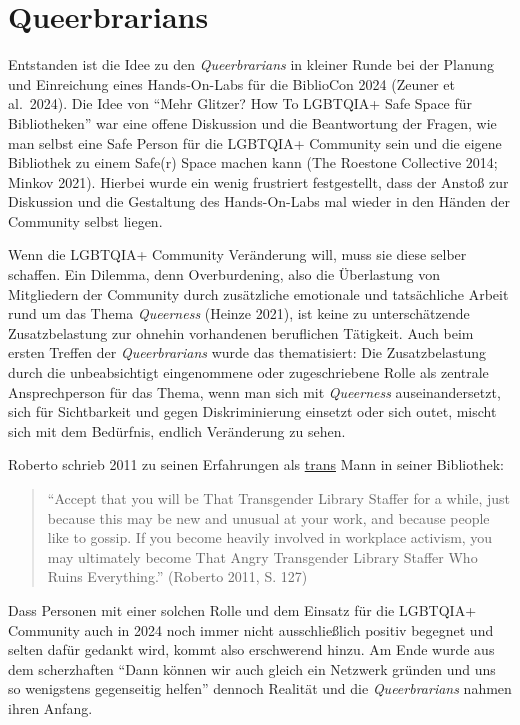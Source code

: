 \documentclass[a4paper,
fontsize=11pt,
oneside,
numbers=noperiodatend,
parskip=half-,
bibliography=totoc,
final
]{scrartcl}
\begin{document}
\section{Queerbrarians}\label{queerbrarians}

Entstanden ist die Idee zu den \emph{Queerbrarians} in kleiner Runde bei
der Planung und Einreichung eines Hands-On-Labs für die BiblioCon 2024
(Zeuner et al.~2024). Die Idee von \enquote{Mehr Glitzer? How To
LGBTQIA+ Safe Space für Bibliotheken} war eine offene Diskussion und die
Beantwortung der Fragen, wie man selbst eine Safe Person für die
LGBTQIA+ Community sein und die eigene Bibliothek zu einem Safe(r) Space
machen kann (The Roestone Collective 2014; Minkov 2021). Hierbei wurde
ein wenig frustriert festgestellt, dass der Anstoß zur Diskussion und
die Gestaltung des Hands-On-Labs mal wieder in den Händen der Community
selbst liegen.

Wenn die LGBTQIA+ Community Veränderung will, muss sie diese selber
schaffen. Ein Dilemma, denn Overburdening, also die Überlastung von
Mitgliedern der Community durch zusätzliche emotionale und tatsächliche
Arbeit rund um das Thema \emph{Queerness} (Heinze 2021), ist keine zu
unterschätzende Zusatzbelastung zur ohnehin vorhandenen beruflichen
Tätigkeit. Auch beim ersten Treffen der \emph{Queerbrarians} wurde das
thematisiert: Die Zusatzbelastung durch die unbeabsichtigt eingenommene
oder zugeschriebene Rolle als zentrale Ansprechperson für das Thema,
wenn man sich mit \emph{Queerness} auseinandersetzt, sich für
Sichtbarkeit und gegen Diskriminierung einsetzt oder sich outet, mischt
sich mit dem Bedürfnis, endlich Veränderung zu sehen.

Roberto schrieb 2011 zu seinen Erfahrungen als
\href{https://lgbtqia.fandom.com/wiki/Transgender}{trans} Mann in seiner
Bibliothek:

\begin{quote}
\enquote{Accept that you will be That Transgender Library Staffer for a
while, just because this may be new and unusual at your work, and
because people like to gossip. If you become heavily involved in
workplace activism, you may ultimately become That Angry Transgender
Library Staffer Who Ruins Everything.} (Roberto 2011, S. 127)
\end{quote}

Dass Personen mit einer solchen Rolle und dem Einsatz für die LGBTQIA+
Community auch in 2024 noch immer nicht ausschließlich positiv begegnet
und selten dafür gedankt wird, kommt also erschwerend hinzu. Am Ende
wurde aus dem scherzhaften \enquote{Dann können wir auch gleich ein
Netzwerk gründen und uns so wenigstens gegenseitig helfen} dennoch
Realität und die \emph{Queerbrarians} nahmen ihren Anfang.
\end{document}
